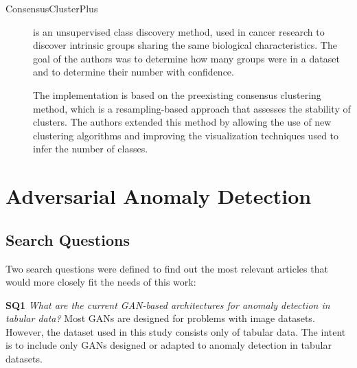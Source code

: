 \begin{description}
    \item[ConsensusClusterPlus] \cite{Wilkerson.Hayes_ConsensusClusterPlusclassdiscovery_2010} is an unsupervised class discovery method, used in cancer research to discover intrinsic groups sharing the same biological characteristics. The goal of the authors was to determine how many groups were in a dataset and to determine their number with confidence.
    
    The implementation is based on the preexisting consensus clustering method, which is a resampling-based approach that assesses the stability of clusters. The authors extended this method by allowing the use of new clustering algorithms and improving the visualization techniques used to infer the number of classes.

\end{description}

\begin{description}
    \item[] 
\end{description}







\section{Adversarial Anomaly Detection}\label{sec:sota_anomaly_detection}

\subsection{Search Questions}\label{sec:gan_search_questions}
Two search questions were defined to find out the most relevant articles that would more closely fit the needs of this work:


\noindent\textbf{SQ1} \textit{What are the current GAN-based architectures for anomaly detection in tabular data?} Most GANs are designed for problems with image datasets. However, the dataset used in this study consists only of tabular data. The intent is to include only GANs designed or adapted to anomaly detection in tabular datasets.

